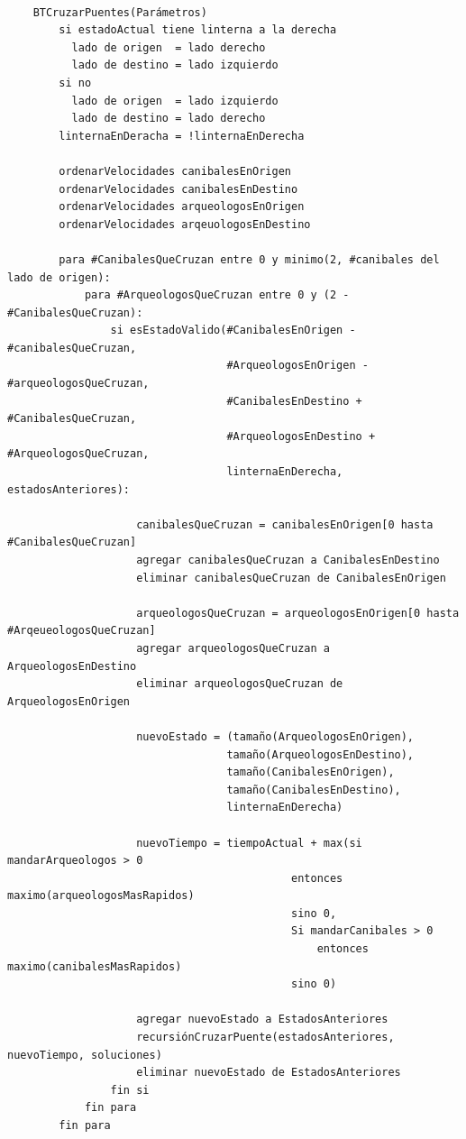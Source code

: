         \begin{codesnippet}
        \begin{verbatim}

    BTCruzarPuentes(Parámetros)
        si estadoActual tiene linterna a la derecha
          lado de origen  = lado derecho
          lado de destino = lado izquierdo
        si no
          lado de origen  = lado izquierdo
          lado de destino = lado derecho
        linternaEnDeracha = !linternaEnDerecha
        
        ordenarVelocidades canibalesEnOrigen
        ordenarVelocidades canibalesEnDestino
        ordenarVelocidades arqueologosEnOrigen
        ordenarVelocidades arqeuologosEnDestino
        
        para #CanibalesQueCruzan entre 0 y minimo(2, #canibales del lado de origen):
            para #ArqueologosQueCruzan entre 0 y (2 - #CanibalesQueCruzan):
                si esEstadoValido(#CanibalesEnOrigen - #canibalesQueCruzan,
                                  #ArqueologosEnOrigen - #arqueologosQueCruzan,
                                  #CanibalesEnDestino + #CanibalesQueCruzan,
                                  #ArqueologosEnDestino + #ArqueologosQueCruzan,
                                  linternaEnDerecha, estadosAnteriores):
        
                    canibalesQueCruzan = canibalesEnOrigen[0 hasta #CanibalesQueCruzan]
                    agregar canibalesQueCruzan a CanibalesEnDestino
                    eliminar canibalesQueCruzan de CanibalesEnOrigen
        
                    arqueologosQueCruzan = arqueologosEnOrigen[0 hasta #ArqeueologosQueCruzan]
                    agregar arqueologosQueCruzan a ArqueologosEnDestino
                    eliminar arqueologosQueCruzan de ArqueologosEnOrigen
        
                    nuevoEstado = (tamaño(ArqueologosEnOrigen),
                                  tamaño(ArqueologosEnDestino),
                                  tamaño(CanibalesEnOrigen),
                                  tamaño(CanibalesEnDestino),
                                  linternaEnDerecha)
        
                    nuevoTiempo = tiempoActual + max(si mandarArqueologos > 0
                                            entonces maximo(arqueologosMasRapidos)
                                            sino 0,
                                            Si mandarCanibales > 0
                                                entonces maximo(canibalesMasRapidos)
                                            sino 0)
        
                    agregar nuevoEstado a EstadosAnteriores
                    recursiónCruzarPuente(estadosAnteriores, nuevoTiempo, soluciones)
                    eliminar nuevoEstado de EstadosAnteriores
                fin si
            fin para
        fin para
        \end{verbatim}
        \end{codesnippet}

